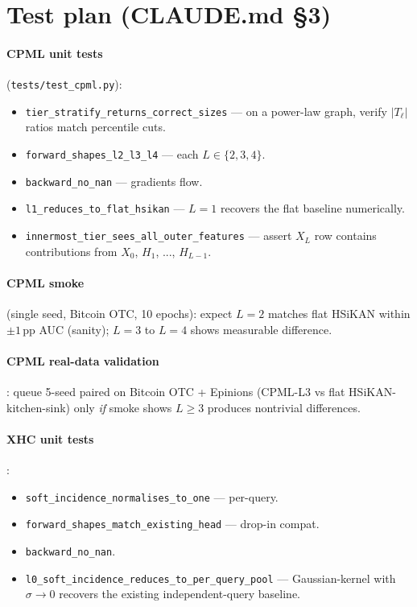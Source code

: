\documentclass[10pt]{article}
\begin{document}
\section*{Test plan (CLAUDE.md \S3)}

\paragraph{CPML unit tests} (\texttt{tests/test\_cpml.py}):
\begin{itemize}
  \item \texttt{tier\_stratify\_returns\_correct\_sizes} --- on a power-law
    graph, verify $|T_\ell|$ ratios match percentile cuts.
  \item \texttt{forward\_shapes\_l2\_l3\_l4} --- each $L \in \{2, 3, 4\}$.
  \item \texttt{backward\_no\_nan} --- gradients flow.
  \item \texttt{l1\_reduces\_to\_flat\_hsikan} --- $L = 1$ recovers the
    flat baseline numerically.
  \item \texttt{innermost\_tier\_sees\_all\_outer\_features} --- assert
    $X_L$ row contains contributions from $X_0$, $H_1$, ..., $H_{L-1}$.
\end{itemize}

\paragraph{CPML smoke} (single seed, Bitcoin OTC, 10 epochs):
expect $L = 2$ matches flat HSiKAN within $\pm 1\,\mathrm{pp}$ AUC
(sanity); $L = 3$ to $L = 4$ shows measurable difference.

\paragraph{CPML real-data validation}: queue 5-seed paired on
Bitcoin OTC + Epinions (CPML-L3 vs flat HSiKAN-kitchen-sink) only
\emph{if} smoke shows $L \ge 3$ produces nontrivial differences.

\paragraph{XHC unit tests}:
\begin{itemize}
  \item \texttt{soft\_incidence\_normalises\_to\_one} --- per-query.
  \item \texttt{forward\_shapes\_match\_existing\_head} --- drop-in compat.
  \item \texttt{backward\_no\_nan}.
  \item \texttt{l0\_soft\_incidence\_reduces\_to\_per\_query\_pool} ---
    Gaussian-kernel with $\sigma \to 0$ recovers the existing
    independent-query baseline.
\end{itemize}
\end{document}
